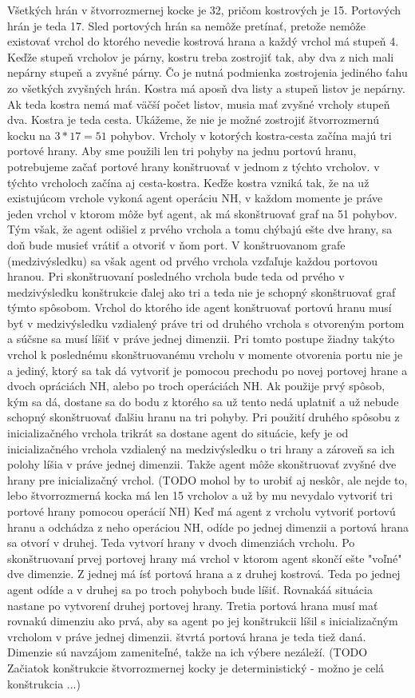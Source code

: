 Všetkých hrán v štvorrozmernej kocke je 32, pričom kostrových je 15.
Portových hrán je teda 17. Sled portových hrán sa nemôže pretínať, pretože
nemôže existovať vrchol do ktorého nevedie kostrová hrana a každý vrchol má
stupeň 4. Keďže stupeň vrcholov je párny, kostru treba zostrojiť tak, aby
dva z nich mali nepárny stupeň a zvyšné párny. Čo je nutná podmienka zostrojenia
jediného ťahu zo všetkých zvyšných hrán. Kostra má aposň dva listy a stupeň
listov je nepárny. Ak teda kostra nemá mať väčší počet listov, musia mať
zvyšné vrcholy stupeň dva. Kostra je teda cesta. Ukážeme, že nie je možné
zostrojiť štvorrozmernú kocku na $3 * 17 = 51$ pohybov. Vrcholy v kotorých kostra-cesta začína
majú tri portové hrany. Aby sme použili len tri pohyby na jednu portovú
hranu, potrebujeme začať portové hrany konštruovať v jednom z týchto
vrcholov. v týchto vrcholoch začína aj cesta-kostra. Keďže kostra vzniká
tak, že na už existujúcom vrchole vykoná agent operáciu NH, v každom momente
je práve jeden vrchol v ktorom môže byť agent, ak má skonštruovať graf na 51
pohybov. Tým však, že agent odišiel z prvého vrchola a tomu chýbajú ešte dve
hrany, sa doň bude musieť vrátiť a otvoriť v ňom port. V konštruovanom grafe
(medzivýsledku) sa však agent od prvého vrchola vzďaľuje každou portovou hranou.
Pri skonštruovaní posledného vrchola bude teda od prvého v medzivýsledku
konštrukcie ďalej ako tri a teda nie je schopný skonštruovať graf týmto
spôsobom. 
Vrchol do ktorého ide agent konštruovať portovú hranu musí byť v
medzivýsledku vzdialený práve tri od druhého vrchola s otvoreným portom a
súčsne sa musí líšiť v práve jednej dimenzii. Pri tomto postupe žiadny
takýto vrchol k poslednému skonštruovanému vrcholu v momente otvorenia portu nie je
a jediný, ktorý sa tak dá vytvoriť je pomocou prechodu po novej portovej
hrane a dvoch opráciách NH, alebo po troch operáciách NH.
Ak použije prvý spôsob, kým sa dá, dostane sa do bodu z ktorého sa už
tento nedá uplatniť a už nebude schopný skonštruovať ďalšiu hranu na tri
pohyby.
Pri použití druhého spôsobu z inicializačného vrchola trikrát sa dostane
agent do situácie, kefy je od inicializačného vrchola vzdialený na
medzivýsledku o tri hrany a zároveň sa ich polohy líšia v práve jednej
dimenzii. Takže agent môže skonštruovať zvyšné dve hrany pre inicializačný
vrchol.
(TODO mohol by to urobiť aj neskôr, ale nejde to, lebo štvorrozmerná kocka má len
15 vrcholov a už by mu nevydalo vytvoriť tri portové hrany pomocou operácií
NH)
Keď má agent z vrcholu vytvoriť portovú hranu a odchádza z neho operáciou
NH, odíde po jednej dimenzii a portová hrana sa otvorí v druhej. Teda
vytvorí hrany v dvoch dimenziách vrcholu.
Po skonštruovaní prvej portovej hrany má vrchol v ktorom agent skončí ešte
"voľné" dve dimenzie. Z jednej má ísť portová hrana a z druhej kostrová.
Teda po jednej agent odíde a v druhej sa po troch pohyboch bude líšiť.
Rovnakáá situácia nastane po vytvorení druhej portovej hrany. Tretia portová
hrana musí mať rovnakú dimenziu ako prvá, aby sa agent po jej konštrukcii
líšil s inicializačným vrcholom v práve jednej dimenzii. štvrtá portová
hrana je teda tiež daná. Dimenzie sú navzájom zameniteľné, takže na ich
výbere nezáleží.
(TODO Začiatok konštrukcie štvorrozmernej kocky je deterministický - možno
je celá konštrukcia ...)


